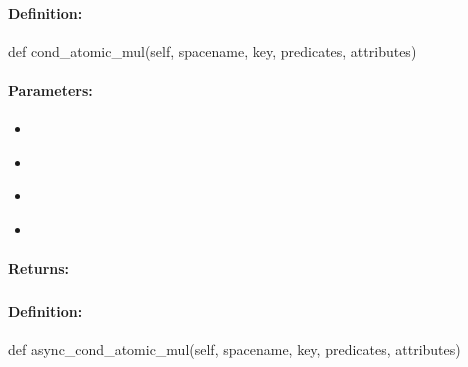 \paragraph{Definition:}
\begin{pythoncode}
def cond_atomic_mul(self, spacename, key, predicates, attributes)
\end{pythoncode}

\paragraph{Parameters:}
\begin{itemize}[noitemsep]
\item {}\\

\item {}\\

\item {}\\

\item {}\\

\end{itemize}

\paragraph{Returns:}


\pagebreak
\subsubsection{}
\label{api:python:async_cond_atomic_mul}


\paragraph{Definition:}
\begin{pythoncode}
def async_cond_atomic_mul(self, spacename, key, predicates, attributes)
\end{pythoncode}

